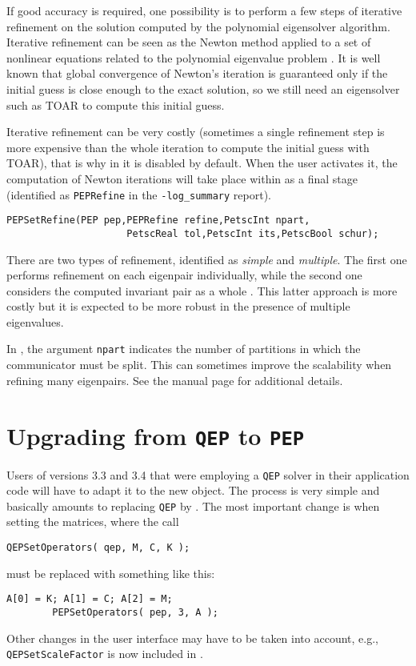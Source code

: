 If good accuracy is required, one possibility is to perform a few steps of iterative refinement on the solution computed by the polynomial eigensolver algorithm. Iterative refinement can be seen as the Newton method applied to a set of nonlinear equations related to the polynomial eigenvalue problem \citep{Betcke:2011:PER}. It is well known that global convergence of Newton's iteration is guaranteed only if the initial guess is close enough to the exact solution, so we still need an eigensolver such as TOAR to compute this initial guess.

Iterative refinement can be very costly (sometimes a single refinement step is more expensive than the whole iteration to compute the initial guess with TOAR), that is why in \slepc it is disabled by default. When the user activates it, the computation of Newton iterations will take place within  as a final stage (identified as \texttt{PEPRefine} in the \Verb!-log_summary! report).

	\begin{Verbatim}[fontsize=\small]
	PEPSetRefine(PEP pep,PEPRefine refine,PetscInt npart,
                     PetscReal tol,PetscInt its,PetscBool schur);
	\end{Verbatim}

There are two types of refinement, identified as \emph{simple} and \emph{multiple}. The first one performs refinement on each eigenpair individually, while the second one considers the computed invariant pair as a whole \citep{Betcke:2011:PER}. This latter approach is more costly but it is expected to be more robust in the presence of multiple eigenvalues.

In , the argument \texttt{npart} indicates the number of partitions in which the communicator must be split. This can sometimes improve the scalability when refining many eigenpairs. See the manual page for additional details.

\section{\label{sec:qeppep}Upgrading from \texttt{QEP} to \texttt{PEP}}

Users of \slepc versions 3.3 and 3.4 that were employing a \texttt{QEP} solver in their application code will have to adapt it to the new  object. The process is very simple and basically amounts to replacing \texttt{QEP} by . The most important change is when setting the matrices, where the call
	\begin{Verbatim}[fontsize=\small]
        QEPSetOperators( qep, M, C, K );
	\end{Verbatim}
must be replaced with something like this:
	\begin{Verbatim}[fontsize=\small]
        A[0] = K; A[1] = C; A[2] = M;
        PEPSetOperators( pep, 3, A );
	\end{Verbatim}

Other changes in the user interface may have to be taken into account, e.g., \texttt{QEPSetScaleFactor} is now included in .

